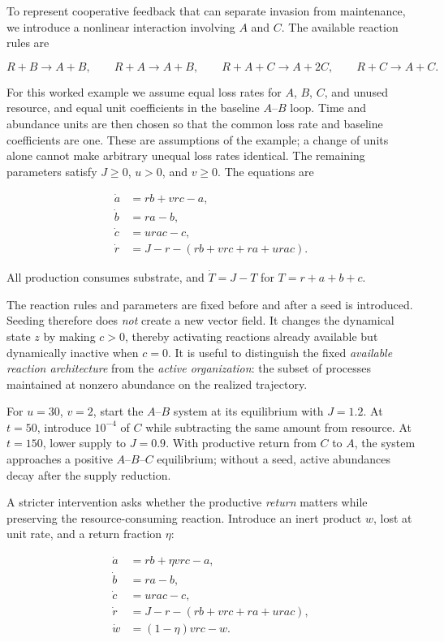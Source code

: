 \documentclass[11pt,a4paper]{article}
\begin{document}
To represent cooperative feedback that can separate invasion from maintenance, we introduce a nonlinear interaction involving $A$ and $C$. The available reaction rules are

\[
R+B\to A+B,
\qquad
R+A\to A+B,
\qquad
R+A+C\to A+2C,
\qquad
R+C\to A+C.
\]

For this worked example we assume equal loss rates for $A$, $B$, $C$, and unused resource, and equal unit coefficients in the baseline $A$--$B$ loop. Time and abundance units are then chosen so that the common loss rate and baseline coefficients are one. These are assumptions of the example; a change of units alone cannot make arbitrary unequal loss rates identical. The remaining parameters satisfy $J\ge0$, $u>0$, and $v\ge0$. The equations are

\begin{align}
\dot a &= rb+vrc-a, \label{eq:nonlinear-a}\\
\dot b &= ra-b, \label{eq:nonlinear-b}\\
\dot c &= urac-c, \label{eq:nonlinear-c}\\
\dot r &= J-r-(rb+vrc+ra+urac). \label{eq:nonlinear-r}
\end{align}

All production consumes substrate, and $\dot T=J-T$ for $T=r+a+b+c$.

The reaction rules and parameters are fixed before and after a seed is introduced. Seeding therefore does \emph{not} create a new vector field. It changes the dynamical state $z$ by making $c>0$, thereby activating reactions already available but dynamically inactive when $c=0$. It is useful to distinguish the fixed \emph{available reaction architecture} from the \emph{active organization}: the subset of processes maintained at nonzero abundance on the realized trajectory.

For $u=30$, $v=2$, start the $A$--$B$ system at its equilibrium with $J=1.2$. At $t=50$, introduce $10^{-4}$ of $C$ while subtracting the same amount from resource. At $t=150$, lower supply to $J=0.9$. With productive return from $C$ to $A$, the system approaches a positive $A$--$B$--$C$ equilibrium; without a seed, active abundances decay after the supply reduction.

A stricter intervention asks whether the productive \emph{return} matters while preserving the resource-consuming reaction. Introduce an inert product $w$, lost at unit rate, and a return fraction $\eta$:

\begin{align}
\dot a &= rb+\eta vrc-a, \label{eq:control-a}\\
\dot b &= ra-b, \\
\dot c &= urac-c, \\
\dot r &= J-r-(rb+vrc+ra+urac), \\
\dot w &= (1-\eta)vrc-w. \label{eq:control-w}
\end{align}
\end{document}
